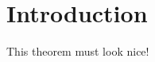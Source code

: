 \newpage
\chapter{Introduction}
\label{Introduction}
\begin{theorem}
	This theorem must look nice!
\end{theorem}
